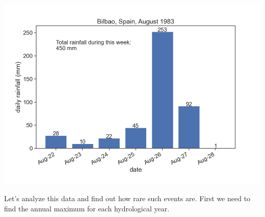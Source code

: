 \documentclass[
  letterpaper,
  DIV=11,
  numbers=noendperiod]{scrreprt}
\begin{document}
\includegraphics{archive/figures/bilbao-august-1983.png}

Let's analyze this data and find out how rare such events are. First we
need to find the annual maximum for each hydrological year.
\end{document}
